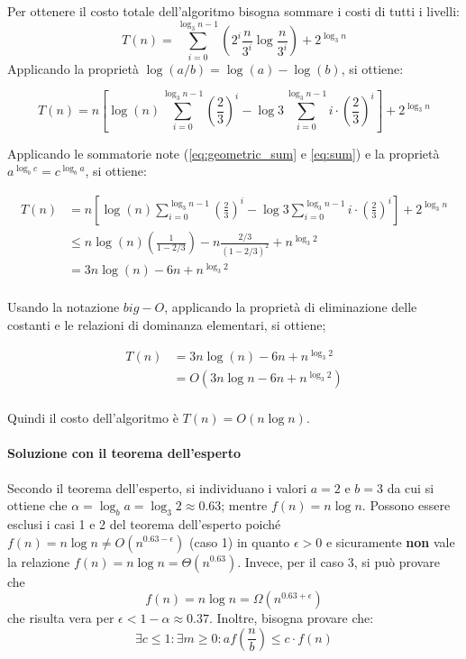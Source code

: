 \documentclass{article}
\begin{document}
Per ottenere il costo totale dell'algoritmo bisogna sommare i costi di tutti i livelli:
\begin{equation*}
    T(n) = \sum_{i=0}^{\log_3n-1} \left(2^i \frac{n}{3^i} \log \frac{n}{3^i}\right) + 2^{\log_3 n}
\end{equation*}
Applicando la proprietà $\log(a/b) = \log(a) - \log (b)$, si ottiene:

\begin{equation*}
    T(n) = n \left[\log(n)\sum_{i=0}^{\log_3n-1} \left(\frac{2}{3}\right)^i - \log3 \sum_{i=0}^{\log_3n-1} i \cdot \left(\frac{2}{3}\right)^i \right] + 2^{\log_3 n}
\end{equation*}

Applicando le sommatorie note (\cref{eq:geometric_sum} e \cref{eq:sum}) e la proprietà $a^{\log_b c} = c ^{\log_b a}$, si ottiene:

\begin{align*}
     T(n) &= n \left[\log(n)\sum_{i=0}^{\log_3n-1} \left(\frac{2}{3}\right)^i - \log3 \sum_{i=0}^{\log_3n-1} i \cdot \left(\frac{2}{3}\right)^i \right] + 2^{\log_3 n}\\
    &\leq n \log(n) \left(\frac{1}{1-2/3}\right) - n \frac{2/3}{(1-2/3)^2} + n^{\log_3 2} \\
    &= 3n\log(n) - 6n + n^{\log_3 2}\\
\end{align*}

Usando la notazione $big-O$, applicando la proprietà di eliminazione delle costanti e le relazioni di dominanza elementari, si ottiene;

\begin{align*}
    T(n) &= 3n\log(n) - 6n + n^{\log_3 2}\\
    &=O(3n\log n  - 6n + n^{\log_3 2})\\
\end{align*}

Quindi il costo dell'algoritmo è $T(n) = O(n\log n)$.

\paragraph{Soluzione con il teorema dell'esperto}
Secondo il teorema dell'esperto, si individuano i valori $a = 2$ e $b = 3$ da cui si ottiene che $\alpha = \log_b a = \log_3 2 \approx 0.63$; mentre $f(n) = n \log n$. Possono essere esclusi i casi 1 e 2 del teorema dell'esperto poiché $f(n) = n \log n \neq O(n^{0.63-\epsilon})$ (caso 1) in quanto $\epsilon > 0$ e sicuramente \textbf{non} vale la relazione  $f(n) = n \log n = \Theta(n^{0.63})$.
Invece, per il caso 3, si può provare che  $$f(n) = n \log n = \Omega(n^{0.63+\epsilon})$$ che risulta vera per $\epsilon < 1 - \alpha \approx 0.37$. Inoltre, bisogna provare che:
\begin{equation*}
    \exists c \leq 1: \exists m \geq 0: a f\left(\frac{n}{b}\right) \leq c\cdot f(n)
\end{equation*}
\end{document}
